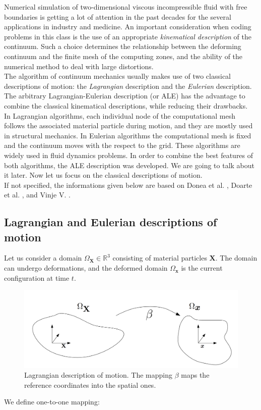 \documentclass[a4paper,11pt,oneside]{book}
\begin{document}
Numerical simulation of two-dimensional viscous incompressible fluid with free boundaries is getting a lot of attention in the past decades for the several applications in industry and medicine. An important consideration when coding problems in this class is the use of an appropriate \emph{kinematical description} of the continuum. Such a choice determines the relationship between the deforming continuum and the finite mesh of the computing zones, and the ability of the numerical method to deal with large distortions. \\
The algorithm of continuum mechanics usually makes use of two classical descriptions of motion: the \emph{Lagrangian} description and the \emph{Eulerian} description. The arbitrary Lagrangian-Eulerian description (or ALE) has the advantage to combine the classical kinematical descriptions, while reducing their drawbacks. \\
In Lagrangian algorithms, each individual node of the computational mesh follows the associated material particle during motion, and they are mostly used in structural mechanics.
In Eulerian algorithms the computational mesh is fixed and the continuum moves with the respect to the grid. These algorithms are widely used in fluid dynamics problems.
In order to combine the best features of both algorithms, the ALE description was developed. We are going to talk about it later. Now let us focus on the classical descriptions of motion. \\
If not specified, the informations given below are based on Donea et al. \cite{donea}, Doarte et al. \cite{duarte}, and Vinje V. \cite{vegard}. 


\subsection{Lagrangian and Eulerian descriptions of motion}
Let us consider a domain $\Omega_{\mathbf{X}} \in \mathbb{R}^3$ consisting of material particles $\mathbf{X}$. The domain can undergo deformations, and the deformed domain $\Omega_\mathbf{x}$ is the current configuration at time $t$.

\begin{figure}[h!]
\centering
\includegraphics[width=\textwidth]{images/ALE1}
\caption{Lagrangian description of motion. The mapping $\beta$ maps the reference coordinates into the spatial ones.}
\end{figure}
We define one-to-one mapping:
\end{document}
